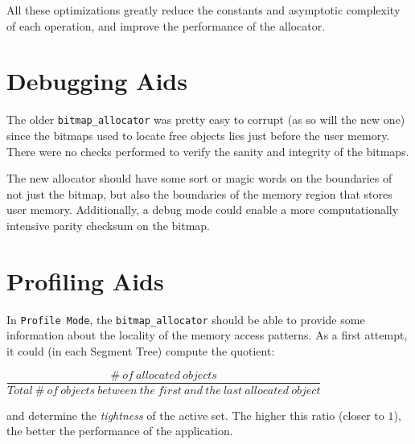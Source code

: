 \documentclass{article}
\begin{document}
All these optimizations greatly reduce the constants and asymptotic
complexity of each operation, and improve the performance of the
allocator.


\section{Debugging Aids}

The older \texttt{bitmap\_allocator} was pretty easy to corrupt (as so
will the new one) since the bitmaps used to locate free objects lies
just before the user memory. There were no checks performed to verify
the sanity and integrity of the bitmaps.

The new allocator should have some sort or magic words on the
boundaries of not just the bitmap, but also the boundaries of the
memory region that stores user memory. Additionally, a debug mode
could enable a more computationally intensive parity checksum on the
bitmap.

\section{Profiling Aids}

In \texttt{Profile Mode}, the \texttt{bitmap\_allocator} should be
able to provide some information about the locality of the memory
access patterns. As a first attempt, it could (in each Segment Tree)
compute the quotient:

$\dfrac{\#\ of\ allocated\ objects}{Total\ \#\ of\ objects\ between\ the\ first\ and\ the\ last\ allocated\ object}$

and determine the \textit{tightness} of the active set. The higher
this ratio (closer to $1$), the better the performance of the
application.
\end{document}
